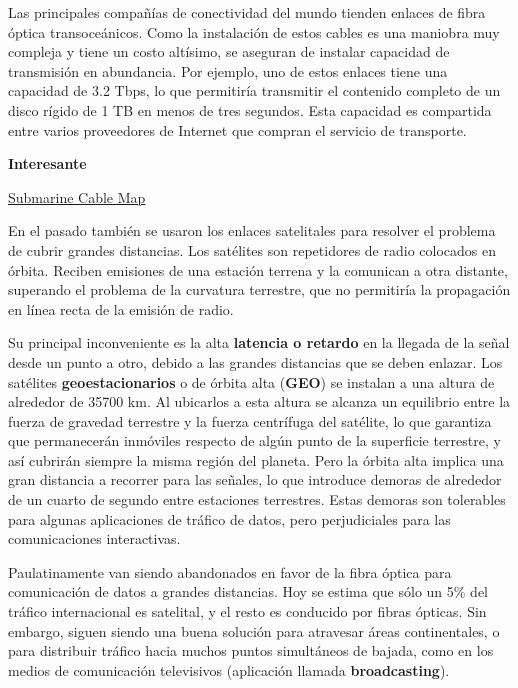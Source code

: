 \documentclass[spanish,A4,]{article}
\begin{document}
Las principales compañías de conectividad del mundo tienden enlaces de
fibra óptica transoceánicos. Como la instalación de estos cables es una
maniobra muy compleja y tiene un costo altísimo, se aseguran de instalar
capacidad de transmisión en abundancia. Por ejemplo, uno de estos
enlaces tiene una capacidad de 3.2 Tbps, lo que permitiría transmitir el
contenido completo de un disco rígido de 1 TB en menos de tres segundos.
Esta capacidad es compartida entre varios proveedores de Internet que
compran el servicio de transporte.

\textbf{Interesante}

\href{http://www.submarinecablemap.com/\#/landing-point/las-toninas-argentina}{Submarine
Cable Map}

En el pasado también se usaron los enlaces satelitales para resolver el
problema de cubrir grandes distancias. Los satélites son repetidores de
radio colocados en órbita. Reciben emisiones de una estación terrena y
la comunican a otra distante, superando el problema de la curvatura
terrestre, que no permitiría la propagación en línea recta de la emisión
de radio.

Su principal inconveniente es la alta \textbf{latencia o retardo} en la
llegada de la señal desde un punto a otro, debido a las grandes
distancias que se deben enlazar. Los satélites \textbf{geoestacionarios}
o de órbita alta (\textbf{GEO}) se instalan a una altura de alrededor de
35700 km. Al ubicarlos a esta altura se alcanza un equilibrio entre la
fuerza de gravedad terrestre y la fuerza centrífuga del satélite, lo que
garantiza que permanecerán inmóviles respecto de algún punto de la
superficie terrestre, y así cubrirán siempre la misma región del
planeta. Pero la órbita alta implica una gran distancia a recorrer para
las señales, lo que introduce demoras de alrededor de un cuarto de
segundo entre estaciones terrestres. Estas demoras son tolerables para
algunas aplicaciones de tráfico de datos, pero perjudiciales para las
comunicaciones interactivas.

Paulatinamente van siendo abandonados en favor de la fibra óptica para
comunicación de datos a grandes distancias. Hoy se estima que sólo un
5\% del tráfico internacional es satelital, y el resto es conducido por
fibras ópticas. Sin embargo, siguen siendo una buena solución para
atravesar áreas continentales, o para distribuir tráfico hacia muchos
puntos simultáneos de bajada, como en los medios de comunicación
televisivos (aplicación llamada \textbf{broadcasting}).
\end{document}
